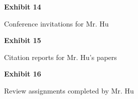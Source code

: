 \documentclass{article}
\begin{document}
% 


\vspace*{\fill}
\begin{center}

{\LARGE \bf
Exhibit 14
}

\vspace{10\baselineskip}

{\large Conference invitations for Mr. Hu}

\end{center}
\vspace*{\fill}

% 

% 

% 

% 

% 


\vspace*{\fill}
\begin{center}

{\LARGE \bf
Exhibit 15
}

\vspace{10\baselineskip}

{\large Citation reports for Mr. Hu’s papers}

\end{center}
\vspace*{\fill}

% 


\vspace*{\fill}
\begin{center}

{\LARGE \bf
Exhibit 16
}

\vspace{10\baselineskip}

{\large  Review assignments completed by Mr. Hu}

\end{center}
\vspace*{\fill}
\end{document}
